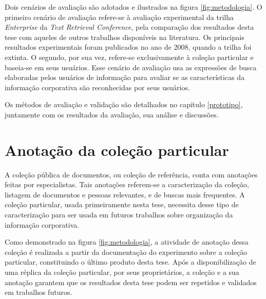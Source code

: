 Dois cenários de avaliação são adotados e ilustrados na figura \ref{fig:metodologia}. O primeiro cenário de avaliação refere-se à avaliação experimental da trilha \textit{Enterprise} da \textit{Text Retrieval Conference}, pela comparação dos resultados desta tese com aqueles de outros trabalhos disponíveis na literatura. Os principais resultados experimentais foram publicados no ano de 2008, quando a trilha foi extinta. O segundo, por sua vez, refere-se exclusivamente à coleção particular e baseia-se em seus usuários. Esse cenário de avaliação usa as expressões de busca elaboradas pelos usuários de informação para avaliar se as características da informação corporativa são reconhecidas por seus usuários. 

Os métodos de avaliação e validação são detalhados no capítulo \ref{prototipo}, juntamente com os resultados da avaliação, sua análise e discussões.



\section{Anotação da coleção particular}

A coleção pública de documentos, ou coleção de referência, conta com anotações feitas por especialistas. Tais anotações referem-se a caracterização da coleção, listagem de documentos e pessoas relevantes, e de buscas mais frequentes. A coleção particular, usada primeiramente nesta tese, necessita desse tipo de caracterização para ser usada em futuros trabalhos sobre organização da informação corporativa.

Como demonstrado na figura \ref{fig:metodologia}, a atividade de anotação dessa coleção é realizada a partir da documentação do experimento sobre a coleção particular, constituindo o último produto desta tese. Após a disponibilização de uma réplica da coleção particular, por seus proprietários, a coleção e a sua anotação garantem que os resultados desta tese podem ser repetidos e validados em trabalhos futuros.

